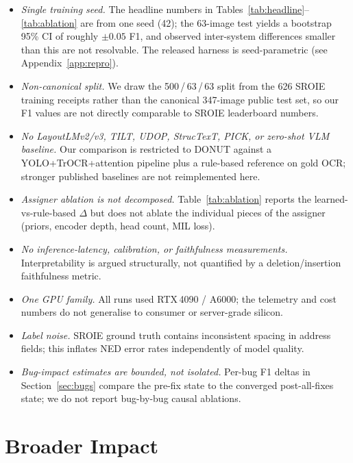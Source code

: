 \documentclass[conference]{IEEEtran}
\begin{document}
\begin{itemize}
  \item \emph{Single training seed.}  The headline numbers in
        Tables~\ref{tab:headline}--\ref{tab:ablation} are from one
        seed (42); the 63-image test yields a bootstrap 95\% CI of
        roughly $\pm 0.05$ F1, and observed inter-system
        differences smaller than this are not resolvable.  The
        released harness is seed-parametric (see
        Appendix~\ref{app:repro}).
  \item \emph{Non-canonical split.}  We draw the 500\,/\,63\,/\,63
        split from the 626 SROIE training receipts rather than the
        canonical 347-image public test set, so our F1 values are
        not directly comparable to SROIE leaderboard numbers.
  \item \emph{No LayoutLMv2/v3, TILT, UDOP, StrucTexT, PICK, or
        zero-shot VLM baseline.}  Our comparison is restricted to
        DONUT against a YOLO+TrOCR+attention pipeline plus a
        rule-based reference on gold OCR; stronger published
        baselines are not reimplemented here.
  \item \emph{Assigner ablation is not decomposed.}  Table~\ref{tab:ablation}
        reports the learned-vs-rule-based $\Delta$ but does not
        ablate the individual pieces of the assigner (priors,
        encoder depth, head count, MIL loss).
  \item \emph{No inference-latency, calibration, or faithfulness
        measurements.}  Interpretability is argued structurally, not
        quantified by a deletion/insertion faithfulness metric.
  \item \emph{One GPU family.}  All runs used RTX\,4090 / A6000; the
        telemetry and cost numbers do not generalise to consumer or
        server-grade silicon.
  \item \emph{Label noise.}  SROIE ground truth contains
        inconsistent spacing in address fields; this inflates NED
        error rates independently of model quality.
  \item \emph{Bug-impact estimates are bounded, not isolated.}
        Per-bug F1 deltas in Section~\ref{sec:bugs} compare the
        pre-fix state to the converged post-all-fixes state; we do
        not report bug-by-bug causal ablations.
\end{itemize}


\section*{Broader Impact}
\end{document}
